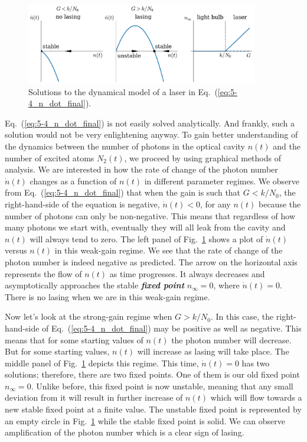 \begin{figure}
    \centering
    \includegraphics[width=0.9\textwidth]{lesson5/5-4_lasing.pdf}
    \caption[Dynamical model of a laser]{Solutions to the dynamical model of a laser in Eq.~(\ref{eq:5-4_n_dot_final}).}
    \label{fig:5-4_lasing}
\end{figure}


Eq.~(\ref{eq:5-4_n_dot_final}) is not easily solved analytically.
And frankly, such a solution would not be very enlightening anyway.
To gain better understanding of the dynamics between the number of photons in the optical cavity $n(t)$ and the number of excited atoms $N_2(t)$, we proceed by using graphical methods of analysis.
We are interested in how the rate of change of the photon number $\dot{n}(t)$ changes as a function of $n(t)$ in different parameter regimes.
We observe from Eq.~(\ref{eq:5-4_n_dot_final}) that when the gain is such that $G < k / N_0$, the right-hand-side of the equation is negative, $\dot{n}(t) < 0$, for any $n(t)$ because the number of photons can only be non-negative.
This means that regardless of how many photons we start with, eventually they will all leak from the cavity and $n(t)$ will always tend to zero.
The left panel of Fig.~\ref{fig:5-4_lasing} shows a plot of $\dot{n}(t)$ versus $n(t)$ in this weak-gain regime.
We see that the rate of change of the photon number is indeed negative as predicted.
The arrow on the horizontal axis represents the flow of $n(t)$ as time progresses.
It always decreases and asymptotically approaches the stable \textit{\textbf{fixed point}} $n_{\infty} = 0$, where $\dot{n}(t) = 0$.
There is no lasing when we are in this weak-gain regime.

Now let's look at the strong-gain regime when $G > k / N_0$.
In this case, the right-hand-side of Eq.~(\ref{eq:5-4_n_dot_final}) may be positive as well as negative.
This means that for some starting values of $n(t)$ the photon number will decrease.
But for some starting values, $n(t)$ will increase as lasing will take place.
The middle panel of Fig.~\ref{fig:5-4_lasing} depicts this regime.
This time, $\dot{n}(t) = 0$ has two solutions; therefore, there are two fixed points.
One of them is our old fixed point $n_{\infty} = 0$.
Unlike before, this fixed point is now unstable, meaning that any small deviation from it will result in further increase of $n(t)$ which will flow towards a new stable fixed point at a finite value.
The unstable fixed point is represented by an empty circle in Fig.~\ref{fig:5-4_lasing} while the stable fixed point is solid.
We can observe amplification of the photon number which is a clear sign of lasing.

